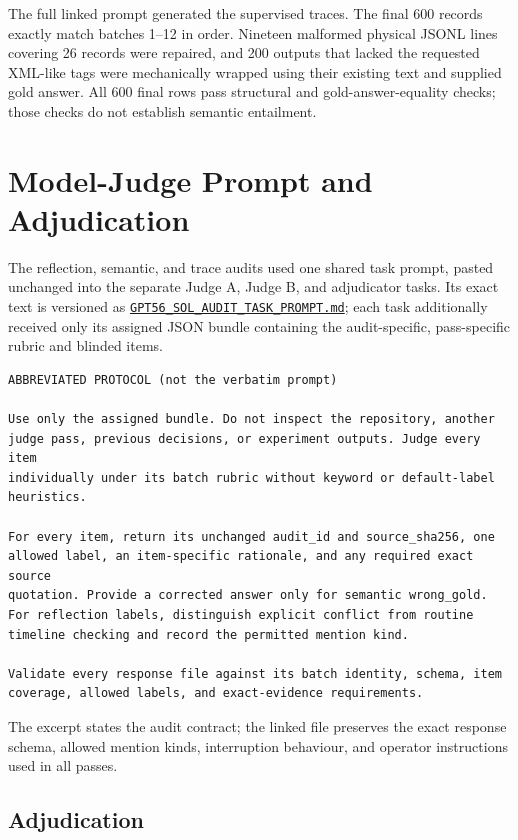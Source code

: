 \documentclass[conference]{IEEEtran}
\begin{document}
The full linked prompt generated the supervised traces. The final 600 records exactly match batches 1--12 in order. Nineteen malformed physical JSONL lines covering 26 records were repaired, and 200 outputs that lacked the requested XML-like tags were mechanically wrapped using their existing text and supplied gold answer. All 600 final rows pass structural and gold-answer-equality checks; those checks do not establish semantic entailment.
\section{Model-Judge Prompt and Adjudication}
\label{app:model-judge-audits}

The reflection, semantic, and trace audits used one shared task prompt, pasted unchanged into the separate Judge A, Judge B, and adjudicator tasks. Its exact text is versioned as
\href{https://github.com/thestbobo/tiser_temporal_reasoning_extension/blob/main/docs/GPT56_SOL_AUDIT_TASK_PROMPT.md}{\texttt{GPT56\_SOL\_AUDIT\_TASK\_PROMPT.md}}; each task additionally received only its assigned JSON bundle containing the audit-specific, pass-specific rubric and blinded items.

\begin{lstlisting}[style=prompt]
ABBREVIATED PROTOCOL (not the verbatim prompt)

Use only the assigned bundle. Do not inspect the repository, another
judge pass, previous decisions, or experiment outputs. Judge every item
individually under its batch rubric without keyword or default-label
heuristics.

For every item, return its unchanged audit_id and source_sha256, one
allowed label, an item-specific rationale, and any required exact source
quotation. Provide a corrected answer only for semantic wrong_gold.
For reflection labels, distinguish explicit conflict from routine
timeline checking and record the permitted mention kind.

Validate every response file against its batch identity, schema, item
coverage, allowed labels, and exact-evidence requirements.
\end{lstlisting}

The excerpt states the audit contract; the linked file preserves the exact response schema, allowed mention kinds, interruption behaviour, and operator instructions used in all passes.
\subsection{Adjudication}
\end{document}
